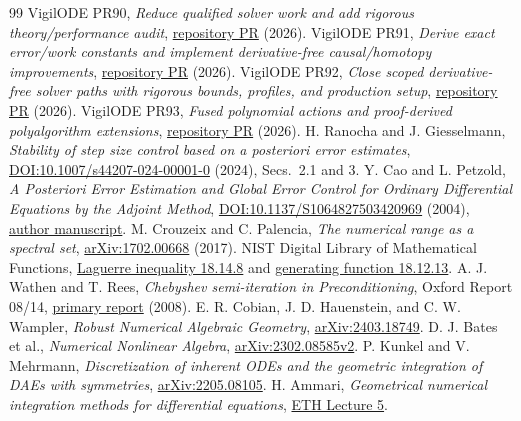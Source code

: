 \documentclass[aps,pra,reprint,onecolumn,10pt,notitlepage,nofootinbib]{revtex4-2}
\begin{document}
\begin{thebibliography}{99}
 VigilODE PR90, \textit{Reduce qualified solver work and add rigorous
theory/performance audit}, \href{https://github.com/cosmosapjw-quantum/vigilode/pull/90}{repository PR} (2026).
 VigilODE PR91, \textit{Derive exact error/work constants and implement
derivative-free causal/homotopy improvements},
\href{https://github.com/cosmosapjw-quantum/vigilode/pull/91}{repository PR} (2026).
 VigilODE PR92, \textit{Close scoped derivative-free solver paths with
rigorous bounds, profiles, and production setup},
\href{https://github.com/cosmosapjw-quantum/vigilode/pull/92}{repository PR} (2026).
 VigilODE PR93, \textit{Fused polynomial actions and proof-derived
polyalgorithm extensions},
\href{https://github.com/cosmosapjw-quantum/vigilode/pull/93}{repository PR} (2026).
 H. Ranocha and J. Giesselmann, \textit{Stability of step size control
based on a posteriori error estimates},
\href{https://doi.org/10.1007/s44207-024-00001-0}{DOI:10.1007/s44207-024-00001-0} (2024), Secs.~2.1 and 3.
 Y. Cao and L. Petzold, \textit{A Posteriori Error Estimation and
Global Error Control for Ordinary Differential Equations by the Adjoint Method},
\href{https://doi.org/10.1137/S1064827503420969}{DOI:10.1137/S1064827503420969} (2004),
\href{https://people.cs.vt.edu/~ycao/publication/siam_42096.pdf}{author manuscript}.
 M. Crouzeix and C. Palencia, \textit{The numerical range as a
spectral set}, \href{https://arxiv.org/abs/1702.00668}{arXiv:1702.00668} (2017).
 NIST Digital Library of Mathematical Functions,
\href{https://dlmf.nist.gov/18.14.E8}{Laguerre inequality 18.14.8} and
\href{https://dlmf.nist.gov/18.12.E13}{generating function 18.12.13}.
 A. J. Wathen and T. Rees, \textit{Chebyshev semi-iteration in
Preconditioning}, Oxford Report 08/14,
\href{https://www.cs.ox.ac.uk/files/1540/NA-08-14.pdf}{primary report} (2008).
 E. R. Cobian, J. D. Hauenstein, and C. W. Wampler,
\textit{Robust Numerical Algebraic Geometry},
\href{https://arxiv.org/pdf/2403.18749}{arXiv:2403.18749}.
 D. J. Bates et al., \textit{Numerical Nonlinear Algebra},
\href{https://arxiv.org/html/2302.08585v2}{arXiv:2302.08585v2}.
 P. Kunkel and V. Mehrmann, \textit{Discretization of inherent ODEs
and the geometric integration of DAEs with symmetries},
\href{https://arxiv.org/pdf/2205.08105}{arXiv:2205.08105}.
 H. Ammari, \textit{Geometrical numerical integration methods for
differential equations},
\href{https://people.math.ethz.ch/~grsam/FS18/NAII/files/slides/ODE-Lecture5.pdf}{ETH Lecture 5}.
\end{thebibliography}
\end{document}

